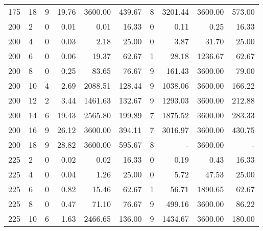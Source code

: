 \begin{appendices}
\begin{table*}
\begin{center}
\begin{tabular} {l l | r r r r | r r r r}
175 & 18  &  9            &  19.76         &  3600.00     &  439.67    &  8           &  3201.44         &  3600.00    &  573.00    \\ 
200 & 2   &  0            &  0.01          &  0.01        &  16.33     &  0           &  0.11            &  0.25       &  16.33     \\ 
200 & 4   &  0            &  0.03          &  2.18        &  25.00     &  0           &  3.87            &  31.70      &  25.00     \\ 
200 & 6   &  0            &  0.06          &  19.37       &  62.67     &  1           &  28.18           &  1236.67    &  62.67     \\ 
200 & 8   &  0            &  0.25          &  83.65       &  76.67     &  9           &  161.43          &  3600.00    &  79.00     \\ 
200 & 10  &  4            &  2.69          &  2088.51     &  128.44    &  9           &  1038.06         &  3600.00    &  166.22    \\ 
200 & 12  &  2            &  3.44          &  1461.63     &  132.67    &  9           &  1293.03         &  3600.00    &  212.88    \\ 
200 & 14  &  6            &  19.43         &  2565.80     &  199.89    &  7           &  1875.52         &  3600.00    &  283.33    \\ 
200 & 16  &  9            &  26.12         &  3600.00     &  394.11    &  7           &  3016.97         &  3600.00    &  430.75    \\ 
200 & 18  &  9            &  28.82         &  3600.00     &  595.67    &  8           &  -               &  3600.00    &  -         \\ 
225 & 2   &  0            &  0.02          &  0.02        &  16.33     &  0           &  0.19            &  0.43       &  16.33     \\ 
225 & 4   &  0            &  0.04          &  1.26        &  25.00     &  0           &  5.72            &  47.53      &  25.00     \\ 
225 & 6   &  0            &  0.82          &  15.46       &  62.67     &  1           &  56.71           &  1890.65    &  62.67     \\ 
225 & 8   &  0            &  0.47          &  71.10       &  76.67     &  9           &  499.16          &  3600.00    &  86.22     \\ 
225 & 10  &  6            &  1.63          &  2466.65     &  136.00    &  9           &  1434.67         &  3600.00    &  180.00    \\ 

\end{tabular}
\end{center}
\end{table*}
\end{appendices}
